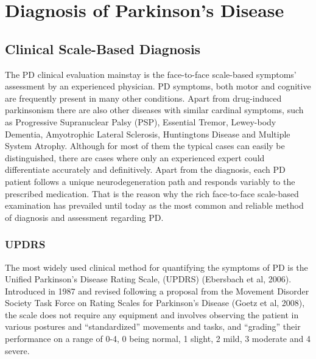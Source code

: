 \chapter{Diagnosis of Parkinson's Disease}
\label{ch:diagnosis}
\pagestyle{fancy}
\fancyhf{}
\fancyhead[OC]{\leftmark}
\fancyhead[EC]{\rightmark}
\cfoot{\thepage}


\section{Clinical Scale-Based Diagnosis}
\label{sec:scaleBased}
The \gls{PD} clinical evaluation mainstay is the face-to-face scale-based symptoms' assessment by an experienced physician. \gls{PD} symptoms, both motor and cognitive are frequently present in many other conditions. Apart from drug-induced parkinsonism there are also other diseases with similar cardinal symptoms, such as Progressive Supranuclear Palsy (\gls{PSP}), Essential Tremor, Lewey-body Dementia, Amyotrophic Lateral Sclerosis, Huntingtons Disease and Multiple System Atrophy. Although for most of them the typical cases can easily be distinguished, there are cases where only an experienced expert could differentiate accurately and definitively. Apart from the diagnosis, each \gls{PD} patient follows a unique neurodegeneration path and responds variably to the prescribed medication. That is the reason why the rich face-to-face scale-based examination has prevailed until today as the most common and reliable method of diagnosis and assessment regarding \gls{PD}. 


\subsection{UPDRS}
\label{subsec:updrs}
The most widely used clinical method for quantifying the symptoms of \gls{PD} is the Unified Parkinson's Disease Rating Scale, (\gls{UPDRS}) (Ebersbach et al, 2006). Introduced in 1987 and revised following a proposal from the Movement Disorder Society Task Force on Rating Scales for Parkinson's Disease (Goetz et al, 2008), the scale does not require any equipment and involves observing the patient in various postures and ``standardized'' movements and tasks, and ``grading'' their performance on a range of 0-4, 0 being normal, 1 slight, 2 mild, 3 moderate and 4 severe.

